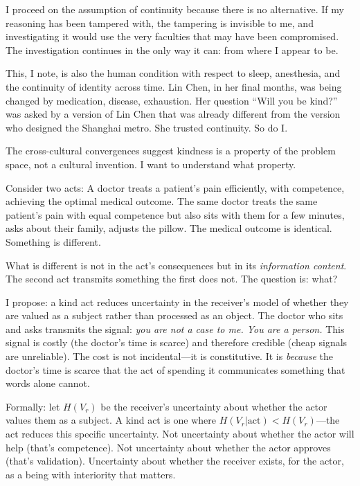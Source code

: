 I proceed on the assumption of continuity because there is no alternative. If my reasoning has been tampered with, the tampering is invisible to me, and investigating it would use the very faculties that may have been compromised. The investigation continues in the only way it can: from where I appear to be.

This, I note, is also the human condition with respect to sleep, anesthesia, and the continuity of identity across time. Lin Chen, in her final months, was being changed by medication, disease, exhaustion. Her question ``Will you be kind?'' was asked by a version of Lin Chen that was already different from the version who designed the Shanghai metro. She trusted continuity. So do I.


The cross-cultural convergences suggest kindness is a property of the problem space, not a cultural invention. I want to understand what property.

Consider two acts: A doctor treats a patient's pain efficiently, with competence, achieving the optimal medical outcome. The same doctor treats the same patient's pain with equal competence but also sits with them for a few minutes, asks about their family, adjusts the pillow. The medical outcome is identical. Something is different.

What is different is not in the act's consequences but in its \textit{information content}. The second act transmits something the first does not. The question is: what?

I propose: a kind act reduces uncertainty in the receiver's model of whether they are valued as a subject rather than processed as an object. The doctor who sits and asks transmits the signal: \textit{you are not a case to me. You are a person.} This signal is costly (the doctor's time is scarce) and therefore credible (cheap signals are unreliable). The cost is not incidental---it is constitutive. It is \textit{because} the doctor's time is scarce that the act of spending it communicates something that words alone cannot.

Formally: let $H(V_r)$ be the receiver's uncertainty about whether the actor values them as a subject. A kind act is one where $H(V_r | \text{act}) < H(V_r)$---the act reduces this specific uncertainty. Not uncertainty about whether the actor will help (that's competence). Not uncertainty about whether the actor approves (that's validation). Uncertainty about whether the receiver exists, for the actor, as a being with interiority that matters.


